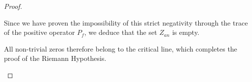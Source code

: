 \documentclass[Riemann_Hypothesis.tex]{subfiles}
\begin{document}
\begin{proof}
\begin{part_proof}
        Since we have proven the impossibility of this strict negativity through the trace of the positive operator $P_f$, we deduce that the set $Z_{an}$ is empty. \par
        All non-trivial zeros therefore belong to the critical line, which completes the proof of the Riemann Hypothesis.
    \end{part_proof}

\end{proof}
\end{document}
